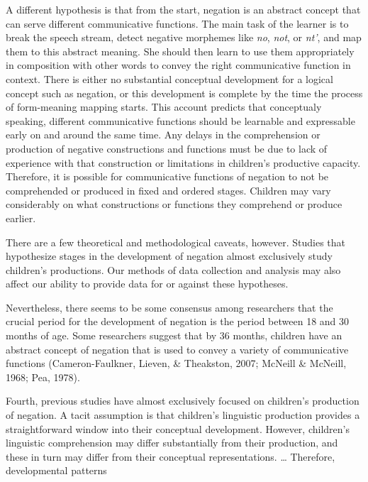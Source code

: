 \documentclass[
  english,
  man,floatsintext]{apa6}
\begin{document}
A different hypothesis is that from the start, negation is an abstract concept that can serve different communicative functions. The main task of the learner is to break the speech stream, detect negative morphemes like \emph{no}, \emph{not}, or \emph{nt'}, and map them to this abstract meaning. She should then learn to use them appropriately in composition with other words to convey the right communicative function in context. There is either no substantial conceptual development for a logical concept such as negation, or this development is complete by the time the process of form-meaning mapping starts. This account predicts that conceptualy speaking, different communicative functions should be learnable and expressable early on and around the same time. Any delays in the comprehension or production of negative constructions and functions must be due to lack of experience with that construction or limitations in children's productive capacity. Therefore, it is possible for communicative functions of negation to not be comprehended or produced in fixed and ordered stages. Children may vary considerably on what constructions or functions they comprehend or produce earlier.

There are a few theoretical and methodological caveats, however. Studies that hypothesize stages in the development of negation almost exclusively study children's productions. Our methods of data collection and analysis may also affect our ability to provide data for or against these hypotheses.

Nevertheless, there seems to be some consensus among researchers that the crucial period for the development of negation is the period between 18 and 30 months of age. Some researchers suggest that by 36 months, children have an abstract concept of negation that is used to convey a variety of communicative functions (Cameron-Faulkner, Lieven, \& Theakston, 2007; McNeill \& McNeill, 1968; Pea, 1978).

Fourth, previous studies have almost exclusively focused on children's production of negation. A tacit assumption is that children's linguistic production provides a straightforward window into their conceptual development. However, children's linguistic comprehension may differ substantially from their production, and these in turn may differ from their conceptual representations. \ldots{} Therefore, developmental patterns

\begingroup
\setlength{\parindent}{-0.5in}
\setlength{\leftskip}{0.5in}

\endgroup
\end{document}
